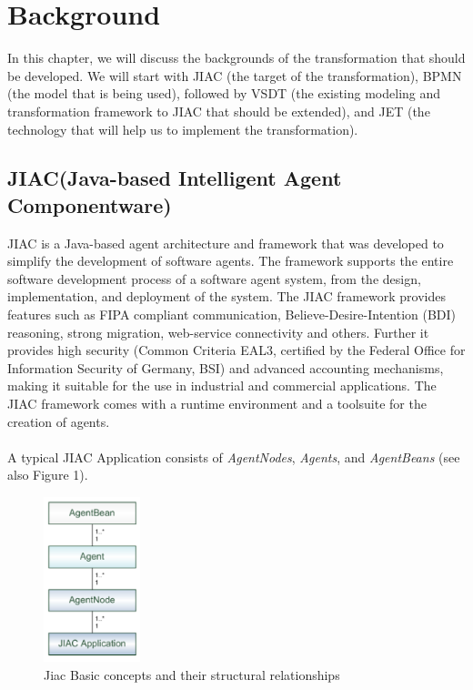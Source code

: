 \chapter{Background}

In this chapter, we will discuss the backgrounds of the transformation that should be developed. We will start with JIAC (the target of the transformation), BPMN (the model that is being used), followed by VSDT (the existing modeling and transformation framework to JIAC that should be extended), and JET (the technology that will help us to implement the transformation).

\section{JIAC(Java-based Intelligent Agent Componentware)}
JIAC is a Java-based agent architecture and framework that was developed to simplify the development of software agents. The framework supports the entire software development process of a software agent system, from the design, implementation, and deployment of the system. The JIAC framework provides features such as FIPA compliant communication,
Believe-Desire-Intention (BDI) reasoning, strong migration, web-service
connectivity and others. Further it provides high security (Common Criteria EAL3,
certified by the Federal Office for Information Security of Germany, BSI) and advanced
accounting mechanisms, making it suitable for the use in industrial and
commercial applications. The JIAC framework comes with a runtime environment
and a toolsuite for the creation of agents. \\\\ A typical JIAC Application consists of \textit{AgentNodes}, \textit{Agents}, and \textit{AgentBeans} (see also Figure 1).
\begin{figure}[h]
	\centering
		\includegraphics[width=0.25\textwidth]{images/jiac_basic.png}
		\caption{Jiac Basic concepts and their structural relationships \cite{JIACMAN10}}
	\label{fig:jiac_basic}
\end{figure}
